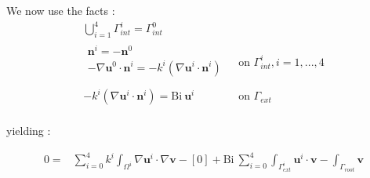 \documentclass[a4paper]{article}
\newcounter{c}
\newcounter{d}
\newcounter{r}
\newcounter{e}
\newcommand{\bu}{\mathbf u}
\newcommand{\bv}{\mathbf v}
\begin{document}
We now use the facts :
$$\begin{array}{ll}
\displaystyle\bigcup_{i=1}^4\Gamma^i_{int}=\Gamma^0_{int}&\\
\begin{array}{l}\mathbf n^i=-\mathbf n^0\\
-\nabla\bu^0\cdot\mathbf n^i=-k^i(\nabla\bu^i\cdot\mathbf n^i)\\
\end{array}&\text{ on }\Gamma^i_{int}, i=1,...,4\\
-k^i(\nabla\bu^i\cdot\mathbf n^i)=\text{Bi}~\bu^i&\text{ on }\Gamma_{ext}\\
\end{array}$$

yielding :

$$\begin{array}{rl}0=&\displaystyle\sum_{i=0}^4k^i\int_{\Omega^i}\nabla\bu^i\cdot\nabla\bv-[0]+\text{Bi}~\sum_{i=0}^4\int_{\Gamma^i_{ext}}\bu^i\cdot\bv-\int_{\Gamma_{root}}\bv
\end{array}$$
\end{document}
